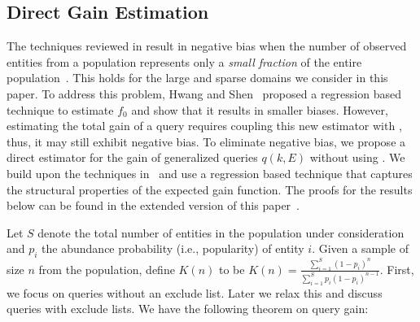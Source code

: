 \subsection{Direct Gain Estimation}
\label{sec:newestim}
The techniques reviewed in  result in negative bias when the number of observed entities from a population represents only a {\em small fraction} of the entire population~\cite{hwang:2010, shen:2003}. This holds for the large and sparse domains we consider in this paper. To address this problem, Hwang and Shen~\cite{hwang:2010} proposed a regression based technique to estimate $f_0$ and show that it results in smaller biases. However, estimating the total gain of a query requires coupling this new estimator with , thus, it may still exhibit negative bias. To eliminate negative bias, we propose a direct estimator for the gain of generalized queries $q(k,E)$ without using . We build upon the techniques in~\cite{hwang:2010} and use a regression based technique that captures the structural properties of the expected gain function. \ifpaper The proofs for the results below can be found in the extended version of this paper~\cite{crowdgatherfull}. \fi

Let $S$ denote the total number of entities in the population under consideration and $p_i$ the abundance probability (i.e., popularity) of entity $i$. Given a sample of size $n$ from the population, define $K(n)$ to be $K(n) = \frac{\sum_{i=1}^S (1-p_i)^n}{\sum_{i=1}^S p_i(1-p_i)^{n-1}}$. First, we focus on queries without an exclude list. Later we relax this and discuss queries with exclude lists. We have the following theorem on query gain:

